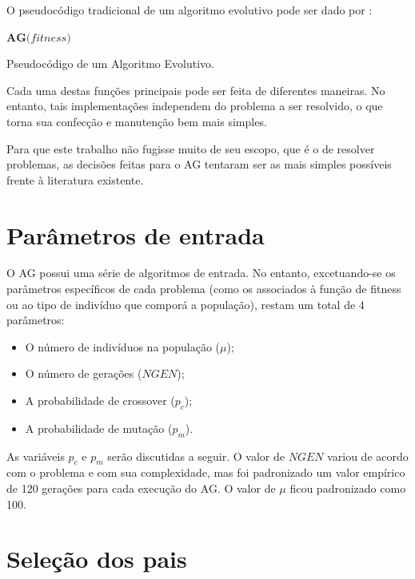 \label{3_algoritmo_genetico}

O pseudocódigo tradicional de um algoritmo evolutivo pode ser dado por \cite{algoritmopseudo}:

\begin{algorithm}[H]
$\textbf{AG(} fitness \textbf{)}$
\caption{Pseudocódigo de um Algoritmo Evolutivo.}
\label{alg:ae}
\end{algorithm}

Cada uma destas funções principais pode ser feita de diferentes maneiras. No entanto, tais implementações independem do problema a ser resolvido, o que torna sua confecção e manutenção bem mais simples.

Para que este trabalho não fugisse muito de seu escopo, que é o de resolver problemas, as decisões feitas para o AG tentaram ser as mais simples possíveis frente à literatura existente.

\section{Parâmetros de entrada}

O AG possui uma série de algoritmos de entrada. No entanto, excetuando-se os parâmetros específicos de cada problema (como os associados à função de fitness ou ao tipo de indivíduo que comporá a população), restam um total de 4 parâmetros:

\begin{itemize}
	\item O número de indivíduos na população ($\mu$);
	\item O número de gerações ($NGEN$);
	\item A probabilidade de crossover ($p_c$);
	\item A probabilidade de mutação ($p_m$).
\end{itemize}

As variáveis $p_c$ e $p_m$ serão discutidas a seguir. O valor de $NGEN$ variou de acordo com o problema e com sua complexidade, mas foi padronizado um valor empírico de 120 gerações para cada execução do AG. O valor de $\mu$ ficou padronizado como 100.

\section{Seleção dos pais}

